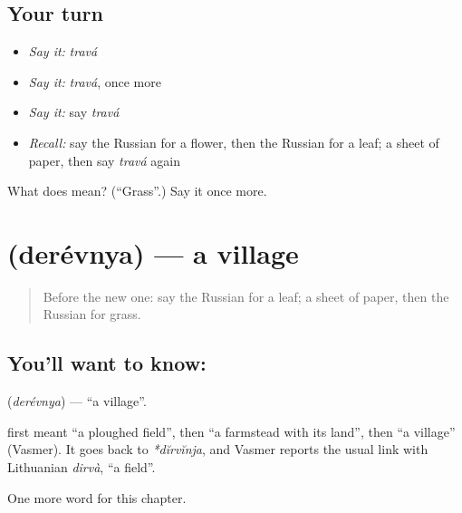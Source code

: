 \subsection*{Your turn}
\begin{itemize}
\raggedright
  \item \emph{Say it:} \emph{travá}
  \item \emph{Say it:} \emph{travá}, once more
  \item \emph{Say it:} say \emph{travá}
  \item \emph{Recall:} say the Russian for a flower, then the Russian for a leaf; a sheet of paper, then say \emph{travá} again
\end{itemize}

\begin{tcolorbox}[breakable,colback=teal!4,colframe=teal!35!black,title={Before you move on}]
What does  mean? (\textquotedblleft{}Grass\textquotedblright{}.) Say it once more.
\end{tcolorbox}
\section[\texorpdfstring{\ru{деревня} (derévnya)}{деревня (derévnya)}]{ (derévnya) — a village}

\label{lesson:RU-C55-village}



\begin{quote}
Before the new one: say the Russian for a leaf; a sheet of paper, then the Russian for grass.
\end{quote}

\subsection*{You'll want to know: }
\textbf{} (\emph{derévnya}) — \textquotedblleft{}a village\textquotedblright{}.

\begin{cousinweb}
\textbf{} first meant \textquotedblleft{}a ploughed field\textquotedblright{}, then \textquotedblleft{}a farmstead with its land\textquotedblright{}, then \textquotedblleft{}a village\textquotedblright{} (Vasmer). It goes back to \emph{*dĭrvĭnja}, and Vasmer reports the usual link with Lithuanian \emph{dirvà}, \textquotedblleft{}a field\textquotedblright{}.
\end{cousinweb}

\begin{grammarlens}[title={What you've built}]
One more word for this chapter.
\end{grammarlens}

